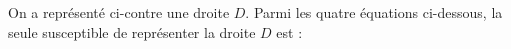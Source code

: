
\begin{wrapstuff}[r,leftsep=7.5mm,abovesep=-6.5mm]
	\begin{GraphiqueTikz}[x=1cm,y=0.8cm,Xmin=-1.25,Xmax=1.1,Ymin=-1.5,Ymax=1.75]
		\TracerAxesGrilles[Origine,Grille=false]{}{}
	\end{GraphiqueTikz}
\end{wrapstuff}

On a représenté ci-contre une droite $D$. Parmi les quatre équations ci-dessous, la seule susceptible de représenter la droite $D$ est :

\smallskip

